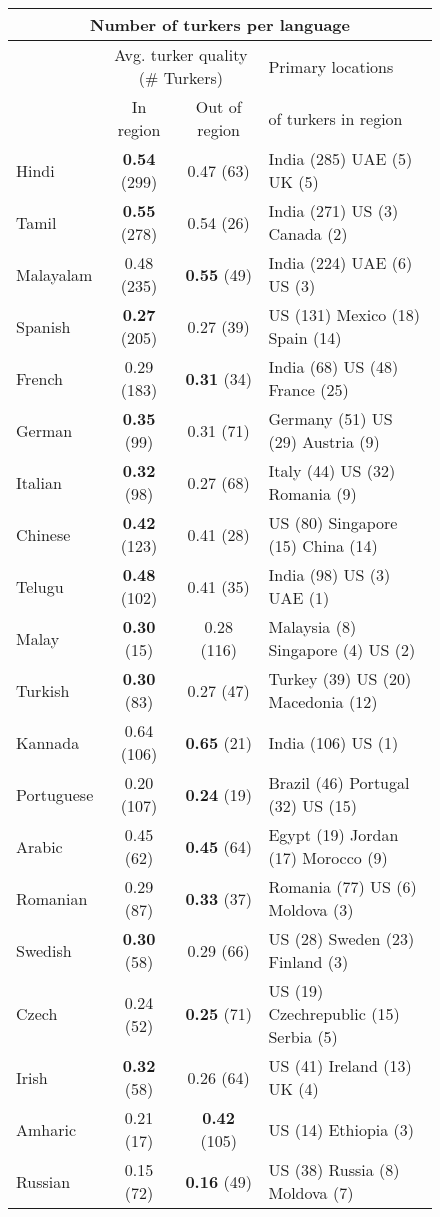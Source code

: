 \begin{figure}[h]
\footnotesize
\begin{tabular}{lccl}
\multicolumn{4}{c}{Number of turkers per language}\\
\hline\hline
&\multicolumn{2}{c}{Avg. turker quality (\# Turkers)}&Primary locations\\
&In region&Out of region&of turkers in region\\
\hline\hline
Hindi&\textbf{0.54} (299)&0.47 (63)&India (285) UAE (5) UK (5) \\
Tamil&\textbf{0.55} (278)&0.54 (26)&India (271) US (3) Canada (2) \\
Malayalam&0.48 (235) &\textbf{0.55} (49)&India (224) UAE (6) US (3) \\
Spanish&\textbf{0.27} (205)&0.27 (39)&US (131) Mexico (18) Spain (14) \\
French&0.29 (183) &\textbf{0.31} (34)&India (68) US (48) France (25) \\
German&\textbf{0.35} (99)&0.31 (71)&Germany (51) US (29) Austria (9) \\
Italian&\textbf{0.32} (98)&0.27 (68)&Italy (44) US (32) Romania (9) \\
Chinese&\textbf{0.42} (123)&0.41 (28)&US (80) Singapore (15) China (14) \\
Telugu&\textbf{0.48} (102)&0.41 (35)&India (98) US (3) UAE (1) \\
Malay&\textbf{0.30} (15)&0.28 (116)&Malaysia (8) Singapore (4) US (2) \\
Turkish&\textbf{0.30} (83)&0.27 (47)&Turkey (39) US (20) Macedonia (12) \\
Kannada&0.64 (106) &\textbf{0.65} (21)&India (106) US (1) \\
Portuguese&0.20 (107) &\textbf{0.24} (19)&Brazil (46) Portugal (32) US (15) \\
Arabic&0.45 (62) &\textbf{0.45} (64)&Egypt (19) Jordan (17) Morocco (9) \\
Romanian&0.29 (87) &\textbf{0.33} (37)&Romania (77) US (6) Moldova (3) \\
Swedish&\textbf{0.30} (58)&0.29 (66)&US (28) Sweden (23) Finland (3) \\
Czech&0.24 (52) &\textbf{0.25} (71)&US (19) Czechrepublic (15) Serbia (5) \\
Irish&\textbf{0.32} (58)&0.26 (64)&US (41) Ireland (13) UK (4) \\
Amharic&0.21 (17) &\textbf{0.42} (105)&US (14) Ethiopia (3) \\
Russian&0.15 (72) &\textbf{0.16} (49)&US (38) Russia (8) Moldova (7) \\
\hline\hline
\end{tabular}
\end{figure}
